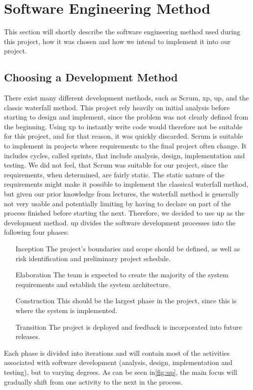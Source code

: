 \section{Software Engineering Method}
This section will shortly describe the software engineering method used during this project, how it was chosen and how we intend to implement it into our project.

\subsection{Choosing a Development Method}
There exist many different development methods, such as Scrum, \ac{xp}, \ac{up}, and the classic waterfall method.
This project rely heavily on initial analysis before starting to design and implement, since the problem was not clearly defined from the beginning.
Using \ac{xp} to instantly write code would therefore not be suitable for this project, and for that reason, it was quickly discarded.
Scrum is suitable to implement in projects where requirements to the final project often change.
It includes cycles, called sprints, that include analysis, design, implementation and testing.
We did not feel, that Scrum was suitable for our project, since the requirements, when determined, are fairly static.
The static nature of the requirements might make it possible to implement the classical waterfall method, but given our prior knowledge from lectures, the waterfall method is generally not very usable and potentially limiting by having to declare on part of the process finished before starting the next.
Therefore, we decided to use \ac{up} as the development method.
\ac{up} divides the software development processes into the following four phases: 

\begin{itemize}
\item[Inception] The project's boundaries and scope should be defined, as well as risk identification and preliminary project schedule.
\item[Elaboration] The team is expected to create the majority of the system requirements and establish the system architecture.
\item[Construction] This should be the largest phase in the project, since this is where the system is implemented.
\item[Transition] The project is deployed and feedback is incorporated into future releases.
\end{itemize}

Each phase is divided into iterations and will contain most of the activities associated with software development (analysis, design, implementation and testing), but to varying degrees. As can be seen in\autoref{fig:up}, the main focus will gradually shift from one activity to the next in the process.

